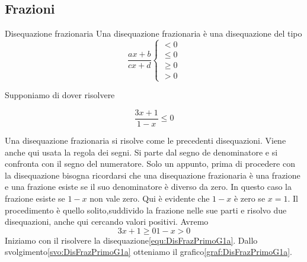 \subsection{Frazioni}
\begin{definizionet}{Disequazione frazionaria}{}
Una disequazione frazionaria è una disequazione del tipo 
\begin{equation}
\dfrac{ax+b}{cx+d}\left\{ \begin{aligned}
<0\\
\leq 0\\
\geq 0\\
>0
\end{aligned}\right .   
\end{equation}
\end{definizionet}
Supponiamo di dover risolvere
\begin{esempiot}{}{}
 \begin{equation}
\dfrac{3x+1}{1-x}\leq 0\label{equ:DisFrazPrimoG1}
\end{equation}
\end{esempiot}
Una disequazione frazionaria si risolve come le precedenti disequazioni. Viene anche qui usata la regola dei segni. Si parte dal segno de denominatore e si confronta con il segno del numeratore. Solo un appunto, prima di procedere con la disequazione bisogna ricordarsi che una disequazione frazionaria è una frazione  e una frazione esiste se il suo denominatore è diverso da zero. In questo caso la frazione esiste se $1-x$ non vale zero. Qui è evidente che $1-x$ è zero se $x=1$. Il procedimento è quello solito,suddivido la frazione nelle sue parti e risolvo due disequazioni, anche qui cercando valori positivi. Avremo
\begin{subequations}
	\begin{equation}
	3x+1\geq 0\label{equ:DisFrazPrimoG1a} 
	\end{equation}
\begin{equation}
1-x> 0\label{equ:DisFrazPrimoG1b} 
\end{equation}
\end{subequations}   
Iniziamo con il risolvere la disequazione\nobs\vref{equ:DisFrazPrimoG1a}. Dallo svolgimento\nobs\vref{svo:DisFrazPrimoG1a} otteniamo il grafico\nobs\vref{graf:DisFrazPrimoG1a}. 
